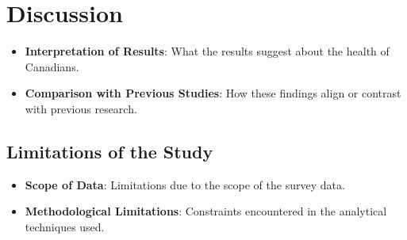\documentclass[
]{book}
\providecommand{\tightlist}{%
  \setlength{\itemsep}{0pt}\setlength{\parskip}{0pt}}
\begin{document}
\section{Discussion}\label{discussion}

\begin{itemize}
\tightlist
\item
  \textbf{Interpretation of Results}: What the results suggest about the health of Canadians.
\item
  \textbf{Comparison with Previous Studies}: How these findings align or contrast with previous research.
\end{itemize}

\subsection*{Limitations of the Study}\label{limitations-of-the-study}

\begin{itemize}
\tightlist
\item
  \textbf{Scope of Data}: Limitations due to the scope of the survey data.
\item
  \textbf{Methodological Limitations}: Constraints encountered in the analytical techniques used.
\end{itemize}

  
\end{document}

